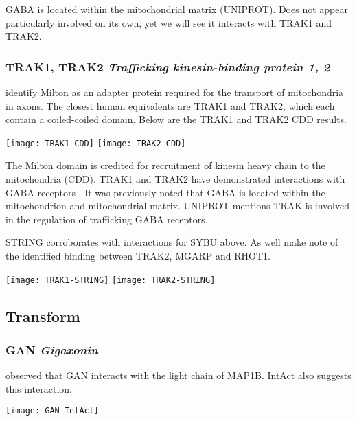 GABA is located within the mitochondrial matrix (UNIPROT). Does not appear
particularly involved on its own, yet we will see it interacts with TRAK1 and
TRAK2.

\subsubsection{TRAK1, TRAK2 \textit{Trafficking kinesin-binding protein 1, 2}}

\cite{Reis2009} identify Milton as an adapter protein required for the
transport of mitochondria in axons.  The closest human equivalents are TRAK1
and TRAK2, which each contain a coiled-coiled domain. Below are the TRAK1 and
TRAK2 CDD results.

\begin{center}
  \texttt{[image: TRAK1-CDD]}
  \texttt{[image: TRAK2-CDD]}
\end{center}

The Milton domain is credited for recruitment of kinesin heavy chain to the
mitochondria (CDD). TRAK1 and TRAK2 have demonstrated interactions with
GABA receptors \citep{Resi2009}. It was previously noted that GABA is located
within the mitochondrion and mitochondrial matrix. UNIPROT mentions TRAK is
involved in the regulation of trafficking GABA receptors.

STRING corroborates with interactions for SYBU above. As well make note of the
identified binding between TRAK2, MGARP and RHOT1.

\begin{center}
  \texttt{[image: TRAK1-STRING]}
  \texttt{[image: TRAK2-STRING]}
\end{center}

\subsection{Transform}

\subsubsection{GAN \textit{Gigaxonin}}

\cite{Allen2005} observed that GAN interacts with the light chain of MAP1B.
IntAct also suggests this interaction.

\begin{center}
  \texttt{[image: GAN-IntAct]}
\end{center}

